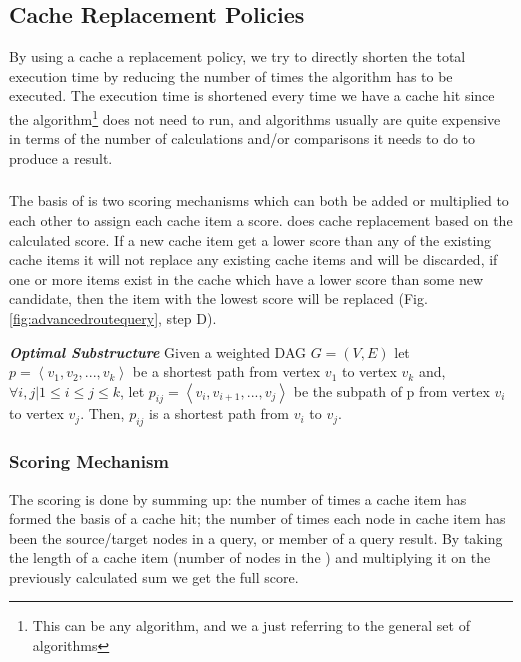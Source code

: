 \subsection{Cache Replacement Policies}

By using a cache a replacement policy, we try to directly shorten the total execution time by reducing the number of times the \spath algorithm has to be executed. 
The execution time is shortened every time we have a cache hit since the \spath algorithm\footnote{This can be any \spath algorithm, and we a just referring to the general set of \spath algorithms} does not need to run, and \spath algorithms usually are quite expensive in terms of the number of calculations and/or comparisons it needs to do to produce a result.


\subsubsection{\osc}

The basis of \osc is two scoring mechanisms which can both be added or multiplied to each other to assign each cache item a score. \osc does cache replacement based on the calculated score. If a new cache item get a lower score than any of the existing cache items it will not replace any existing cache items and will be discarded, if one or more items exist in the cache which have a lower score than some new candidate, then the item with the lowest score will be replaced (Fig. \ref{fig:advancedroutequery}, step D).

\begin{lemma}{\it \textbf{\spath Optimal Substructure}}
Given a weighted DAG $G = (V, E)$ let $p = \left< v_1, v_2,..., v_k \right>$ be a shortest path from vertex $v_1$ to vertex $v_k$ and, $\forall i,j | 1 \leq i \leq j \leq k$, let $p_{ij} = \left<v_i, v_{i+1},..., v_j \right>$ be the subpath of p from vertex $v_i$ to vertex $v_j$. Then, $p_{ij}$ is a shortest path from $v_i$ to $v_j$.
\end{lemma}


\subsubsection{Scoring Mechanism}


The scoring is done by summing up: the number of times a cache item has formed the basis of a cache hit; the number of times each node in cache item has been the source/target nodes in a query, or member of a query result. By taking the length of a cache item (number of nodes in the \spath) and multiplying it on the previously calculated sum we get the full score.

